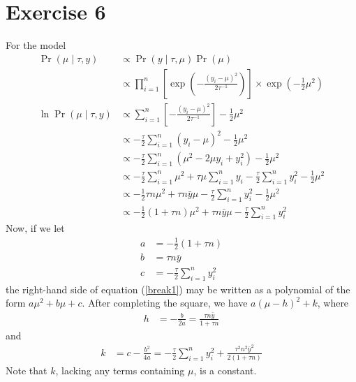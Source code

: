 \documentclass[letterpaper]{amsart}
\begin{document}
\section*{Exercise 6}
For the model
\begin{align}
  \Pr(\mu\mid\tau, y)
  &\propto
    \Pr(y\mid\tau, \mu)
    \Pr(\mu)
  \\
  &\propto
    \prod_{i=1}^n
    \left[
    \exp\left(-\frac{\left(y_i-\mu\right)^2}{2\tau^{-1}}\right)
    \right]
    \times
    \exp\left(-\frac{1}{2}\mu^2\right)
  \\
  \ln
  \Pr(\mu\mid\tau, y)
  &\propto
    \sum_{i=1}^n
    \left[
    -\frac{\left(y_i-\mu\right)^2}{2\tau^{-1}}
    \right]
    -\frac{1}{2}\mu^2
  \\
  &\propto
    -\frac{\tau}{2}
    \sum_{i=1}^n
    \left(y_i-\mu\right)^2
    -\frac{1}{2}\mu^2
  \\
  &\propto
    -\frac{\tau}{2}
    \sum_{i=1}^n
    \left(\mu^2-2\mu y_i + y_i^2\right)
    -\frac{1}{2}\mu^2
  \\
  &\propto
    -\frac{\tau}{2}
    \sum_{i=1}^n \mu^2
    +\tau\mu\sum_{i=1}^n y_i
    -\frac{\tau}{2}
    \sum_{i=1}^n y_i^2
    -\frac{1}{2}\mu^2
  \\
  &\propto
    -\frac{1}{2}
    \tau n \mu^2
    +\tau n\bar{y}\mu
    -\frac{\tau}{2}
    \sum_{i=1}^n y_i^2
    -\frac{1}{2}\mu^2
  \\
  \label{break1}
  &\propto
    -\frac{1}{2}
    \left(1+\tau n\right) \mu^2
    +\tau n\bar{y}\mu
    -\frac{\tau}{2}
    \sum_{i=1}^n y_i^2
\end{align}
Now, if we let
\begin{align}
  a &=
      -\frac{1}{2}
      \left(1+\tau n\right)
  \\
  b &=
      \tau n\bar{y}
  \\
  c &=
      -\frac{\tau}{2}
      \sum_{i=1}^n y_i^2
\end{align}
the right-hand side of equation (\ref{break1}) may be written as a polynomial of the form
$a\mu^2 + b\mu + c$.
After completing the square, we have
$a\left(\mu - h\right)^2+k$,
where
\begin{align}
  h &= -\frac{b}{2a}
      = \frac{\tau n\bar{y}}{1+\tau n}
\end{align}
and
\begin{align}
  k &= c-\frac{b^2}{4a}
      = -\frac{\tau}{2}
      \sum_{i=1}^n y_i^2
      +\frac{\tau^2 n^2\bar{y}^2}{2\left(1+\tau n\right)}
\end{align}
Note that $k$, lacking any terms containing $\mu$, is a constant.
\end{document}
